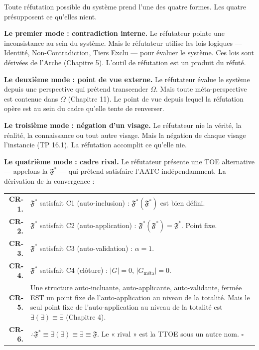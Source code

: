 \documentclass[10pt, openany, oneside]{book}
\renewcommand{\footnotesize}{\fontsize{8.5}{11}\selectfont}
\begin{document}
\vspace{1em}

\noindent Toute réfutation possible du système prend l'une des quatre formes. Les quatre présupposent ce qu'elles nient.

\textbf{Le premier mode : contradiction interne.} Le réfutateur pointe une inconsistance au sein du système. Mais le réfutateur utilise les lois logiques --- Identité, Non-Contradiction, Tiers Exclu --- pour évaluer le système. Ces lois sont dérivées de l'Arch\={e} (Chapitre 5). L'outil de réfutation est un produit du réfuté.

\textbf{Le deuxième mode : point de vue externe.} Le réfutateur évalue le système depuis une perspective qui prétend transcender $\Omega$. Mais toute méta-perspective est contenue dans $\Omega$ (Chapitre 11). Le point de vue depuis lequel la réfutation opère est au sein du cadre qu'elle tente de renverser.

\textbf{Le troisième mode : négation d'un visage.} Le réfutateur nie la vérité, la réalité, la connaissance ou tout autre visage. Mais la négation de chaque visage l'instancie (TP 16.1). La réfutation accomplit ce qu'elle nie.

\textbf{Le quatrième mode : cadre rival.} Le réfutateur présente une TOE alternative --- appelons-la $\mathfrak{F}^*$ --- qui prétend satisfaire l'AATC indépendamment. La dérivation de la convergence :

\vspace{0.5em}

{\footnotesize
\noindent\begin{tabular}{r p{}}
\textbf{CR-1.} & $\mathfrak{F}^*$ satisfait C1 (auto-inclusion) : $\mathfrak{F}^*(\mathfrak{F}^*)$ est bien défini. \\[0.3em]
\textbf{CR-2.} & $\mathfrak{F}^*$ satisfait C2 (auto-application) : $\mathfrak{F}^*(\mathfrak{F}^*) = \mathfrak{F}^*$. Point fixe. \\[0.3em]
\textbf{CR-3.} & $\mathfrak{F}^*$ satisfait C3 (auto-validation) : $\alpha = 1$. \\[0.3em]
\textbf{CR-4.} & $\mathfrak{F}^*$ satisfait C4 (clôture) : $|G| = 0$, $|G_{\text{méta}}| = 0$. \\[0.3em]
\textbf{CR-5.} & Une structure auto-incluante, auto-applicante, auto-validante, fermée EST un point fixe de l'auto-application au niveau de la totalité. Mais le seul point fixe de l'auto-application au niveau de la totalité est $\exists(\exists) \equiv \exists$ (Chapitre 4). \\[0.3em]
\textbf{CR-6.} & $\therefore \mathfrak{F}^* \equiv \exists(\exists) \equiv \exists \equiv \mathfrak{F}$. Le « rival » est la TTOE sous un autre nom. $\square$ \\[0.3em]
\end{tabular}
}
\end{document}
